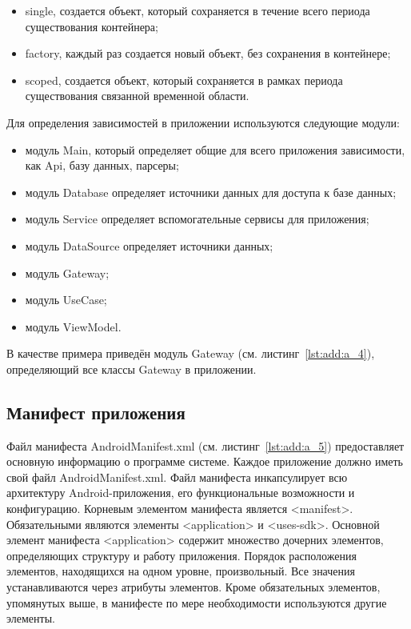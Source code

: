 \begin{itemize}
  \item single, создается объект, который сохраняется в течение всего периода существования контейнера;
  \item factory, каждый раз создается новый объект, без сохранения в контейнере;
  \item scoped, создается объект, который сохраняется в рамках периода существования связанной временной области.
\end{itemize}

Для определения зависимостей в приложении используются следующие модули:
\begin{itemize}
  \item модуль Main, который определяет общие для всего приложения зависимости, как Api, базу данных, парсеры;
  \item модуль Database определяет источники данных для доступа к базе данных;
  \item модуль Service определяет вспомогательные сервисы для приложения;
  \item модуль DataSource определяет источники данных;
  \item модуль Gateway;
  \item модуль UseCase;
  \item модуль ViewModel.
\end{itemize}


В качестве примера приведён модуль Gateway (см. листинг~\ref{lst:add:a_4}), определяющий все классы Gateway в приложении.

\subsection{Манифест приложения}
Файл манифеста AndroidManifest.xml (см. листинг~\ref{lst:add:a_5}) предоставляет основную информацию о программе системе. Каждое приложение должно иметь свой файл AndroidManifest.xml. Файл манифеста инкапсулирует всю архитектуру Android-приложения, его функциональные возможности и конфигурацию. Корневым элементом манифеста является <manifest>. Обязательными являются элементы <application> и <uses-sdk>. Основной элемент манифеста <application> содержит множество дочерних элементов, определяющих структуру и работу приложения. Порядок расположения элементов, находящихся на одном уровне, произвольный. Все значения устанавливаются через атрибуты элементов. Кроме обязательных элементов, упомянутых выше, в манифесте по мере необходимости используются другие элементы.

